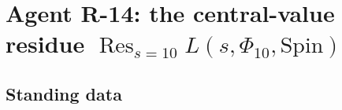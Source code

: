 %

\chapter*{Agent R-14: the central-value residue $\operatorname{Res}_{s=10} L(s, \Phi_{10}, \mathrm{Spin})$}

\section*{Standing data}

